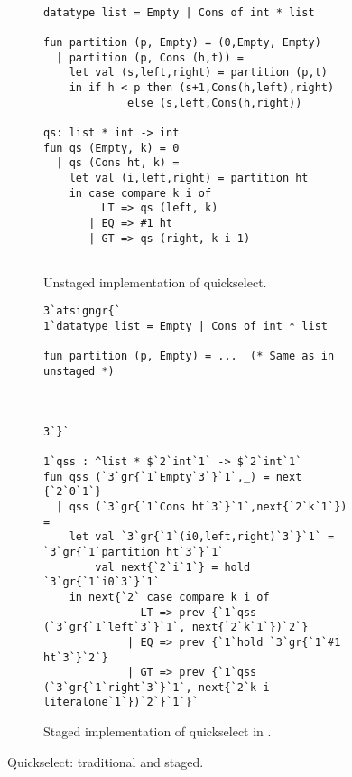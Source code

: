 
\begin{figure*}
\begin{subfigure}[t]{0.45\textwidth}
\begin{lstlisting} 

datatype list = Empty | Cons of int * list

fun partition (p, Empty) = (0,Empty, Empty) 
  | partition (p, Cons (h,t)) = 
    let val (s,left,right) = partition (p,t) 
    in if h < p then (s+1,Cons(h,left),right) 
             else (s,left,Cons(h,right))

qs: list * int -> int
fun qs (Empty, k) = 0
  | qs (Cons ht, k) =
    let val (i,left,right) = partition ht
    in case compare k i of
         LT => qs (left, k)
       | EQ => #1 ht
       | GT => qs (right, k-i-1)
       
\end{lstlisting}
\caption{Unstaged implementation of quickselect.}
\label{fig:qs-unstaged}
\end{subfigure}
\hfill
\begin{subfigure}[t]{0.55\textwidth}
\begin{lstlisting} 
3`atsigngr{`  
1`datatype list = Empty | Cons of int * list

fun partition (p, Empty) = ...  (* Same as in unstaged *)



3`}`

1`qss : ^list * $`2`int`1` -> $`2`int`1`
fun qss (`3`gr{`1`Empty`3`}`1`,_) = next {`2`0`1`}
  | qss (`3`gr{`1`Cons ht`3`}`1`,next{`2`k`1`}) = 
    let val `3`gr{`1`(i0,left,right)`3`}`1` = `3`gr{`1`partition ht`3`}`1`
        val next{`2`i`1`} = hold `3`gr{`1`i0`3`}`1`
    in next{`2` case compare k i of
               LT => prev {`1`qss (`3`gr{`1`left`3`}`1`, next{`2`k`1`})`2`}
             | EQ => prev {`1`hold `3`gr{`1`#1 ht`3`}`2`}
             | GT => prev {`1`qss (`3`gr{`1`right`3`}`1`, next{`2`k-i-literalone`1`})`2`}`1`}`
\end{lstlisting}
\caption{Staged implementation of quickselect in \lang.}

\label{fig:qs-staged}
\end{subfigure}
\caption{Quickselect: traditional and staged.}
\end{figure*}


